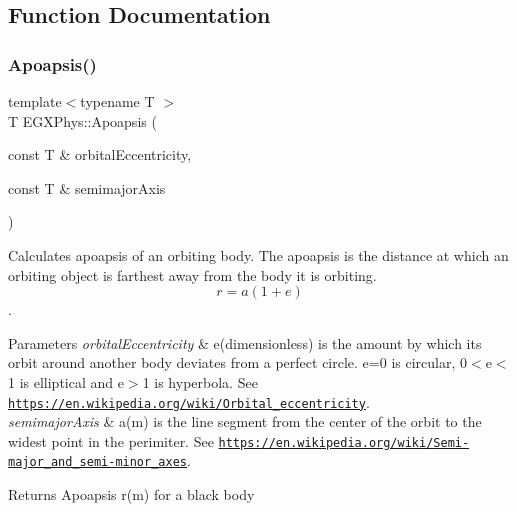\subsection{Function Documentation}
\mbox{\label{group___astrophysics_gaf962e650bf84a568458e8eb39b1c61ba}} 
\subsubsection{\texorpdfstring{Apoapsis()}{Apoapsis()}}
{\footnotesize\ttfamily template$<$typename T $>$ \\
T E\+G\+X\+Phys\+::\+Apoapsis (\begin{DoxyParamCaption}\item[{const T \&}]{orbital\+Eccentricity,  }\item[{const T \&}]{semimajor\+Axis }\end{DoxyParamCaption})}



Calculates apoapsis of an orbiting body. The apoapsis is the distance at which an orbiting object is farthest away from the body it is orbiting. \[r=a(1+e)\]. 


\begin{DoxyParams}{Parameters}
{\em orbital\+Eccentricity} & e(dimensionless) is the amount by which its orbit around another body deviates from a perfect circle. e=0 is circular, 0$<$e$<$1 is elliptical and e$>$1 is hyperbola. See \href{https://en.wikipedia.org/wiki/Orbital_eccentricity}{\tt https\+://en.\+wikipedia.\+org/wiki/\+Orbital\+\_\+eccentricity}. \\
\hline
{\em semimajor\+Axis} & a(m) is the line segment from the center of the orbit to the widest point in the perimiter. See \href{https://en.wikipedia.org/wiki/Semi-major_and_semi-minor_axes}{\tt https\+://en.\+wikipedia.\+org/wiki/\+Semi-\/major\+\_\+and\+\_\+semi-\/minor\+\_\+axes}. \\
\hline
\end{DoxyParams}
\begin{DoxyReturn}{Returns}
Apoapsis r(m) for a black body 
\end{DoxyReturn}
\mbox{\label{group___astrophysics_ga909f82edfaed449b44e94788b642ebb8}} 
